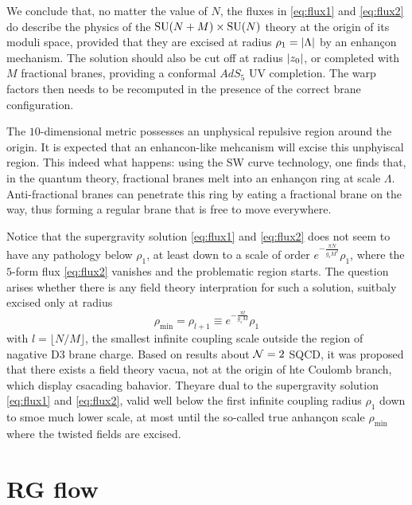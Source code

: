     We conclude that, no matter the value of $N$, the fluxes in \eqref{eq:flux1} and \eqref{eq:flux2} do describe the physics of the $\text{SU}(N+M)\times\text{SU}(N)$ theory at the origin of its moduli space, provided that they are excised at radius $\rho_1=\abs{\Lambda}$ by an enhançon mechanism. The solution should also be cut off at radius $\abs{z_0}$, or completed with $M$ fractional branes, providing a conformal $AdS_5$ UV completion. The warp factors then needs to be recomputed in the presence of the correct brane configuration.

    \begin{mybox}
        The $10$-dimensional metric possesses an unphysical repulsive region around the origin. It is expected that an enhancon-like mehcanism will excise this unphyiscal region. This indeed what happens: using the SW curve technology, one finds that, in the quantum theory, fractional branes melt into an enhançon ring at scale $\Lambda$. Anti-fractional branes can penetrate this ring by eating a fractional brane on the way, thus forming a regular brane that is free to move everywhere.
    \end{mybox}

    Notice that the supergravity solution \eqref{eq:flux1} and \eqref{eq:flux2} does not seem to have any pathology below $\rho_1$, at least down to a scale of order $e^{-\frac{\pi N}{g_s M^2}}\rho_1$, where the $5$-form flux \eqref{eq:flux2} vanishes and the problematic region starts. The question arises whether there is any field theory interpration for such a solution, suitbaly excised only at radius
    \begin{equation}
        \rho_{\text{min}}=\rho_{l+1}\equiv e^{-\frac{\pi l}{g_s M}}\rho_1
    \end{equation}
    with $l=\lfloor N/M\rfloor$, the smallest infinite coupling scale outside the region of nagative D$3$ brane charge. Based on results about $\mathcal{N}=2$ SQCD, it was proposed that there exists a field theory vacua, not at the origin of hte Coulomb branch, which display csacading bahavior. Theyare dual to the supergravity solution \eqref{eq:flux1} and \eqref{eq:flux2}, valid well below the first infinite coupling radius $\rho_1$ down to smoe much lower scale, at most until the so-called true anhançon scale $\rho_{\text{min}}$ where the twisted fields are excised.
        
\section{RG flow}

